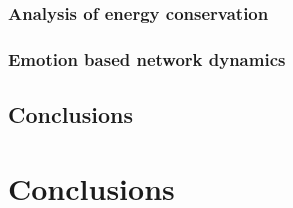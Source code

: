 \documentclass[a4,12pt]{ozu-thesis}
\begin{document}
\subsection{Analysis of energy conservation}

\subsection{Emotion based network dynamics}


\section{Conclusions}


\chapter{Conclusions}



\begin{thebibliography}{99}


\end{thebibliography}


\appendix



\begin{postliminary}
\end{postliminary}
\end{document}
